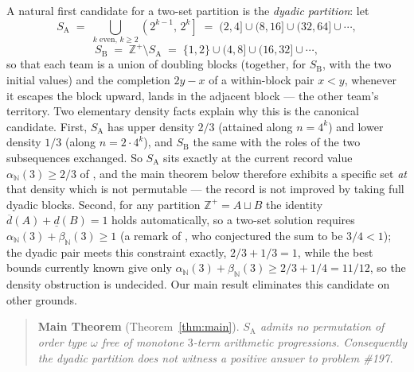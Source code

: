 \documentclass[11pt]{article}
\theoremstyle{definition}
\newcommand{\Z}{\mathbb{Z}}
\newcommand{\N}{\mathbb{N}}
\newcommand{\SA}{S_{\mathrm{A}}}
\newcommand{\SB}{S_{\mathrm{B}}}
\begin{document}
A natural first candidate for a two-set partition is the \emph{dyadic
partition}: let
\[
\SA \;=\; \bigcup_{k \text{ even},\, k \ge 2} \left(2^{k-1},\, 2^{k}\right]
\;=\; (2,4] \cup (8,16] \cup (32,64] \cup \cdots,
\]
\[
\SB{} \;=\; \Z^+ \setminus \SA \;=\; \{1,2\} \cup (4,8] \cup (16,32] \cup \cdots,
\]
so that each team is a union of doubling blocks (together, for $\SB{}$, with
the two initial values) and the completion
$2y - x$ of a within-block pair $x < y$, whenever it escapes the block
upward, lands in the adjacent block --- the other team's territory. Two
elementary density facts explain why this is the canonical candidate. First,
$\SA$ has upper density $2/3$ (attained along $n = 4^k$) and lower density
$1/3$ (along $n = 2\cdot 4^k$), and $\SB{}$ the same with the roles of the two
subsequences exchanged. So $\SA$ sits exactly at the current record value
$\alpha_{\N}(3) \ge 2/3$ of \cite{Gen26}, and the main theorem below
therefore exhibits a specific set \emph{at} that density which is not
permutable --- the record is not improved by taking full dyadic blocks.
Second, for any partition $\Z^+ = A \sqcup B$ the identity
$\overline{d}(A) + \underline{d}(B) = 1$ holds automatically, so a two-set
solution requires $\alpha_{\N}(3) + \beta_{\N}(3) \ge 1$ (a remark of
\cite{LV11}, who conjectured the sum to be $3/4 < 1$); the dyadic pair meets
this constraint exactly, $2/3 + 1/3 = 1$, while the best bounds currently
known give only $\alpha_{\N}(3) + \beta_{\N}(3) \ge 2/3 + 1/4 = 11/12$, so
the density obstruction is undecided. Our main result eliminates this
candidate on other grounds.

\begin{quote}
\textbf{Main Theorem} (Theorem~\ref{thm:main}). \emph{$\SA$ admits no
permutation of order type $\omega$ free of monotone $3$-term arithmetic
progressions. Consequently the dyadic partition does not witness a positive
answer to problem \#197.}
\end{quote}
\end{document}
